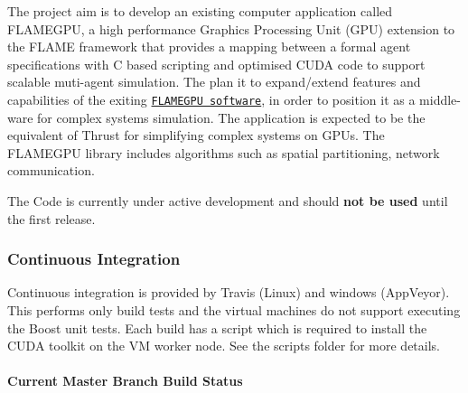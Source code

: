 The project aim is to develop an existing computer application called F\+L\+A\+M\+E\+G\+PU, a high performance Graphics Processing Unit (G\+PU) extension to the F\+L\+A\+ME framework that provides a mapping between a formal agent specifications with C based scripting and optimised C\+U\+DA code to support scalable muti-\/agent simulation. The plan it to expand/extend features and capabilities of the exiting \href{https://github.com/FLAMEGPU/FLAMEGPU}{\tt F\+L\+A\+M\+E\+G\+PU software}, in order to position it as a middle-\/ware for complex systems simulation. The application is expected to be the equivalent of Thrust for simplifying complex systems on G\+P\+Us. The F\+L\+A\+M\+E\+G\+PU library includes algorithms such as spatial partitioning, network communication.

The Code is currently under active development and should {\bfseries not be used} until the first release.

\subsubsection*{Continuous Integration}

Continuous integration is provided by Travis (Linux) and windows (App\+Veyor). This performs only build tests and the virtual machines do not support executing the Boost unit tests. Each build has a script which is required to install the C\+U\+DA toolkit on the VM worker node. See the scripts folder for more details.

\paragraph*{Current Master Branch Build Status}

\href{https://ci.appveyor.com/project/mondus/flamegpu2-dev/branch/master}{\tt }

\href{https://travis-ci.org/FLAMEGPU/FLAMEGPU2_dev}{\tt } 